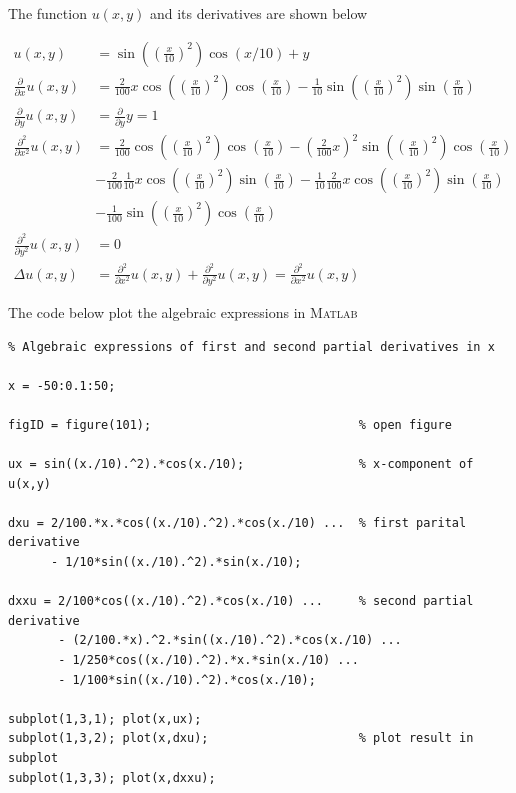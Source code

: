 \documentclass[paper=a4, fontsize=12pt]{article} %
\begin{document}
The function $u(x,y)$ and its derivatives are shown below

\begin{align*}
u(x,y) &= \sin\left(\left(\frac{x}{10}\right) ^2\right ) \cos(x/10)+y \\
\frac{\partial}{\partial x} u(x,y) &= \frac{2}{100}x\cos\left(\left(\frac{x}{10}\right) ^2\right )\cos\left(\frac{x}{10}\right )- \frac{1}{10}\sin\left(\left(\frac{x}{10}\right) ^2\right )\sin\left (\frac{x}{10}\right )\\
\frac{\partial}{\partial y} u(x,y) &= \frac{\partial}{\partial y}y = 1   \\
\frac{\partial^2}{\partial x^2} u(x,y) &= \frac{2}{100}\cos\left(\left(\frac{x}{10}\right) ^2\right )\cos\left(\frac{x}{10}\right ) - \left ( \frac{2}{100}x\right )^2 \sin \left(\left(\frac{x}{10}\right) ^2\right )\cos\left(\frac{x}{10}\right ) \\
 &- \frac{2}{100}\frac{1}{10}x\cos\left(\left(\frac{x}{10}\right) ^2\right )\sin\left(\frac{x}{10}\right ) - \frac{1}{10}\frac{2}{100}x \cos\left(\left(\frac{x}{10}\right) ^2\right )\sin\left (\frac{x}{10}\right )\\
 & - \frac{1}{100}\sin\left(\left(\frac{x}{10}\right) ^2\right )\cos\left (\frac{x}{10}\right )\\
\frac{\partial^2}{\partial y^2} u(x,y) &= 0 \\
\Delta u(x,y) &= \frac{\partial^2}{\partial x^2} u(x,y) + \frac{\partial^2}{\partial y^2} u(x,y) =  \frac{\partial^2}{\partial x^2} u(x,y)
\end{align*}


The code below plot the algebraic expressions in \textsc{Matlab}

\begin{lstlisting}
% Algebraic expressions of first and second partial derivatives in x

x = -50:0.1:50;

figID = figure(101);                             % open figure

ux = sin((x./10).^2).*cos(x./10);                % x-component of u(x,y)

dxu = 2/100.*x.*cos((x./10).^2).*cos(x./10) ...  % first parital derivative
      - 1/10*sin((x./10).^2).*sin(x./10);

dxxu = 2/100*cos((x./10).^2).*cos(x./10) ...     % second partial derivative
       - (2/100.*x).^2.*sin((x./10).^2).*cos(x./10) ...
       - 1/250*cos((x./10).^2).*x.*sin(x./10) ...
       - 1/100*sin((x./10).^2).*cos(x./10);
       
subplot(1,3,1); plot(x,ux);
subplot(1,3,2); plot(x,dxu);                     % plot result in subplot
subplot(1,3,3); plot(x,dxxu);

\end{lstlisting}
\end{document}
